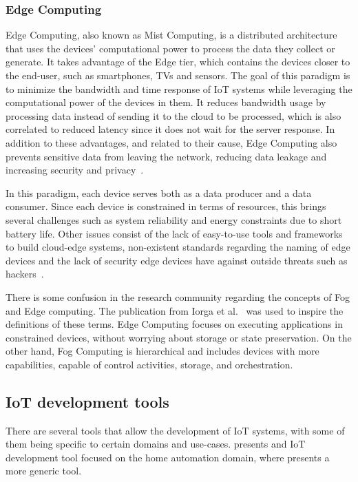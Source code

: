 \subsubsection{Edge Computing}\label{sec:edge_computing}

Edge Computing, also known as Mist Computing, is a distributed architecture that uses the devices' computational power to process the data they collect or generate. It takes advantage of the Edge tier, which contains the devices closer to the end-user, such as smartphones, TVs and sensors. The goal of this paradigm is to minimize the bandwidth and time response of IoT systems while leveraging the computational power of the devices in them. It reduces bandwidth usage by processing data instead of sending it to the cloud to be processed, which is also correlated to reduced latency since it does not wait for the server response. In addition to these advantages, and related to their cause, Edge Computing also prevents sensitive data from leaving the network, reducing data leakage and increasing security and privacy~\cite{edge_computing, edge_computing_2019}.

In this paradigm, each device serves both as a data producer and a data consumer. Since each device is constrained in terms of resources, this brings several challenges such as system reliability and energy constraints due to short battery life. Other issues consist of the lack of easy-to-use tools and frameworks to build cloud-edge systems, non-existent standards regarding the naming of edge devices and the lack of security edge devices have against outside threats such as hackers~\cite{promise_of_edge_computing}.

There is some confusion in the research community regarding the concepts of Fog and Edge computing. The publication from Iorga et al.~\cite{fog_edge_differences} was used to inspire the definitions of these terms. Edge Computing focuses on executing applications in constrained devices, without worrying about storage or state preservation. On the other hand, Fog Computing is hierarchical and includes devices with more capabilities, capable of control activities, storage, and orchestration.

\subsection{IoT development tools}\label{sec:iot_tools}

There are several tools that allow the development of IoT systems, with some of them being specific to certain domains and use-cases.  presents and IoT development tool focused on the home automation domain, where  presents a more generic tool.

